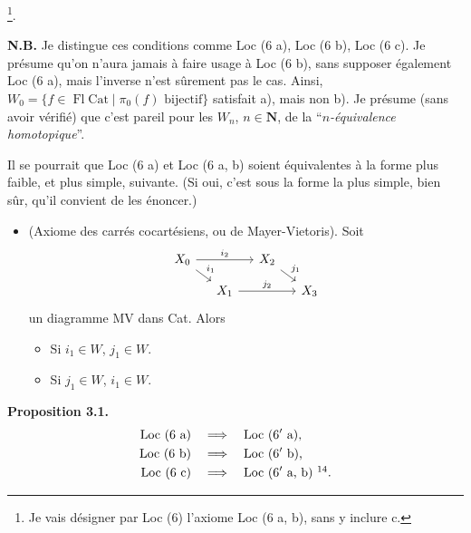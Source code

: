 \documentclass[11pt]{article}
\newcommand{\printedpage}[1]{\marginpar{\footnotesize p.~#1}}
\newcommand{\msp}[1]{\marginpar{\footnotesize [#1]}}
\newcommand{\Cat}{\mathrm{Cat}}
\newcommand{\Fl}{\operatorname{Fl}}
\begin{document}
\printedpage{13}
\msp{page 17'}
\noindent\footnote[13]{Je vais désigner par Loc (6) l'axiome Loc (6 a, b), sans y inclure c.}.

\textbf{N.B.} Je distingue ces conditions comme Loc (6 a), Loc (6 b), Loc (6 c). Je présume qu'on n'aura jamais à faire usage à Loc (6 b), sans supposer également Loc (6 a), mais l'inverse n'est sûrement pas le cas. Ainsi, $W_0=\{f\in\Fl\Cat\mid\pi_0(f)\text{ bijectif}\}$ satisfait a), mais non b). Je présume (sans avoir vérifié) que c'est pareil pour les $W_n$, $n\in\mathbf{N}$, de la “\textit{$n$-équivalence homotopique}”.

Il se pourrait que Loc (6 a) et Loc (6 a, b) soient équivalentes à la forme plus faible, et plus simple, suivante. (Si oui, c'est sous la forme la plus simple, bien sûr, qu'il convient de les énoncer.)

\begin{itemize}[leftmargin=5em,labelwidth=4em,align=left]
\item[\textbf{Loc 6$'$}] (Axiome des carrés cocartésiens, ou de Mayer-Vietoris). Soit
\[
\begin{tikzcd}[row sep=small,column sep=small]
X_0 \arrow[rr,"i_2"] \arrow[dr,"i_1"] & & X_2 \arrow[dr,"j_1"] & \\
& X_1 \arrow[rr,"j_2"] & & X_3
\end{tikzcd}
\]
un diagramme MV dans Cat. Alors
\begin{itemize}[leftmargin=3em,labelwidth=2.5em,align=right]
\item[a)] Si $i_1\in W$, $j_1\in W$.
\item[b)] Si $j_1\in W$, $i_1\in W$.
\end{itemize}
\end{itemize}

\msp{page 18'}
\textbf{Proposition 3.1.}
\[
\begin{aligned}
\text{Loc (6 a)}\quad &\Longrightarrow\quad \text{Loc (6$'$ a),}\\
\text{Loc (6 b)}\quad &\Longrightarrow\quad \text{Loc (6$'$ b),}\\
\text{Loc (6 c)}\quad &\Longrightarrow\quad \text{Loc (6$'$ a, b)}\ \footnotemark[14].
\end{aligned}
\]
\end{document}
